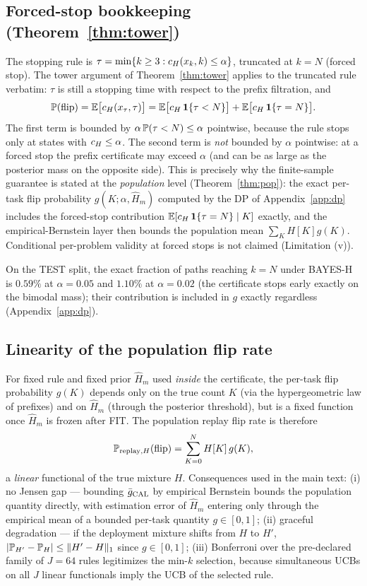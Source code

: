 \subsection{Forced-stop bookkeeping (Theorem~\ref{thm:tower})}

The stopping rule is $\tau=\min\{k\ge 3:\cert(x_k,k)\le\alpha\}$, truncated
at $k=N$ (forced stop). The tower argument of Theorem~\ref{thm:tower} applies
to the truncated rule verbatim: $\tau$ is still a stopping time with respect
to the prefix filtration, and
\[
\P(\flip)=\E\big[\cert(x_\tau,\tau)\big]
=\E\big[\cert\,\mathbf 1\{\tau<N\}\big]+\E\big[\cert\,\mathbf 1\{\tau=N\}\big].
\]
The first term is bounded by $\alpha\,\P(\tau<N)\le\alpha$ pointwise, because
the rule stops only at states with $\cert\le\alpha$. The second term is
\emph{not} bounded by $\alpha$ pointwise: at a forced stop the prefix
certificate may exceed $\alpha$ (and can be as large as the posterior mass on
the opposite side). This is precisely why the finite-sample guarantee is
stated at the \emph{population} level (Theorem~\ref{thm:pop}): the exact
per-task flip probability $g(K;\alpha,\widehat H_m)$ computed by the DP of
Appendix~\ref{app:dp} includes the forced-stop contribution
$\E[\cert\,\mathbf 1\{\tau=N\}\mid K]$ exactly, and the empirical-Bernstein
layer then bounds the population mean $\sum_K H[K]g(K)$. Conditional
per-problem validity at forced stops is not claimed (Limitation (v)).

\begin{remark}
On the TEST split, the exact fraction of paths reaching $k=N$ under
BAYES-H is $0.59\%$ at $\alpha=0.05$ and $1.10\%$ at $\alpha=0.02$ (the
certificate stops early exactly on the bimodal mass); their contribution
is included in $g$ exactly regardless (Appendix~\ref{app:dp}).
\end{remark}

\subsection{Linearity of the population flip rate}

For fixed rule and fixed prior $\widehat H_m$ used \emph{inside} the
certificate, the per-task flip probability $g(K)$ depends only on the true
count $K$ (via the hypergeometric law of prefixes) and on $\widehat H_m$
(through the posterior threshold), but is a fixed function once $\widehat H_m$
is frozen after FIT. The population replay flip rate is therefore
\[
\P_{\text{replay},H}(\flip)=\sum_{K=0}^{N} H[K]\,g(K),
\]
a \emph{linear} functional of the true mixture $H$. Consequences used in the
main text: (i) no Jensen gap --- bounding $\bar g_{\calD}$ by empirical
Bernstein bounds the population quantity directly, with estimation error of
$\widehat H_m$ entering only through the empirical mean of a bounded per-task
quantity $g\in[0,1]$; (ii) graceful degradation --- if the deployment mixture
shifts from $H$ to $H'$, $|\P_{H'}-\P_H|\le\|H'-H\|_1$ since
$g\in[0,1]$; (iii) Bonferroni over the pre-declared family of $J=64$ rules
legitimizes the min-$k$ selection, because simultaneous UCBs on all $J$
linear functionals imply the UCB of the selected rule.

